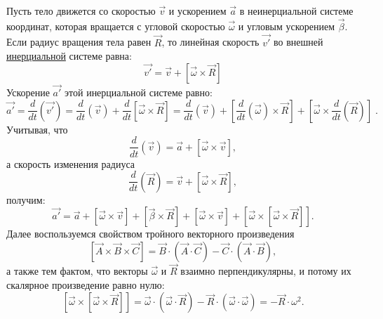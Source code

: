 Пусть тело движется со скоростью $\vec{v}$ и ускорением $\vec{a}$ в неинерциальной системе координат, которая вращается с угловой скоростью $\vec{\omega}$ и угловым ускорением $\vec{\beta}$. Если радиус вращения тела равен $\vec{R}$,
то линейная скорость $\vec{v\prime}$ во внешней \underline{инерциальной} системе равна:
   \begin{displaymath}
    \vec{v\prime}= \vec{v}+\left[\vec{\omega}\times\vec{R}\right]
   \end{displaymath}
 Ускорение $\vec{a\prime}$ этой инерциальной системе равно:
   \begin{displaymath}
   \vec{a\prime}= \frac{d}{dt}\left(\vec{v\prime}\right) =
   \frac{d}{dt}\left(\vec{v}\right) +
   \frac{d}{dt}\left[\vec{\omega}\times\vec{R}\right]=
   \frac{d}{dt}\left(\vec{v}\right) +
   \left[\frac{d}{dt}\left(\vec{\omega}\right)\times\vec{R}\right] +
   \left[\vec{\omega}\times\frac{d}{dt}\left(\vec{R}\right)\right]\;.
   \end{displaymath}
 Учитывая, что
   \begin{displaymath}
   \frac{d}{dt}\left(\vec{v}\right) = \vec{a}+\left[\vec{\omega}\times\vec{v}\right],
   \end{displaymath}
 а скорость изменения радиуса
   \begin{displaymath}
   \frac{d}{dt}\left(\vec{R}\right) = \vec{v}+\left[\vec{\omega}\times\vec{R}\right],
   \end{displaymath}
получим:
   \begin{displaymath}
   \vec{a\prime}=
   \vec{a}+
   \left[\vec{\omega}\times\vec{v}\right]+
   \left[\vec{\beta}\times\vec{R}\right]+
   \left[\vec{\omega}\times\vec{v}\right]+
   \left[\vec{\omega}\times\left[\vec{\omega}\times\vec{R}\right]\right].
      \end{displaymath}
Далее воспользуемся свойством тройного векторного произведения
   \begin{displaymath}
\left[\vec{A}\times\vec{B}\times\vec{C}\right] =
\vec{B}\cdot\left(\vec{A}\cdot\vec{C}\right) -
\vec{C}\cdot\left(\vec{A}\cdot\vec{B}\right),
      \end{displaymath}
а также тем фактом, что векторы $\vec{\omega}$ и $\vec{R}$ взаимно перпендикулярны, и потому их скалярное произведение равно нулю:
   \begin{displaymath}
   \left[\vec{\omega}\times\left[\vec{\omega}\times\vec{R}\right]\right]=
   \vec{\omega}\cdot\left(\vec{\omega}\cdot\vec{R}\right)-
   \vec{R}\cdot\left(\vec{\omega}\cdot\vec{\omega}\right)=
   -\vec{R}\cdot\omega^2.
   \end{displaymath}
